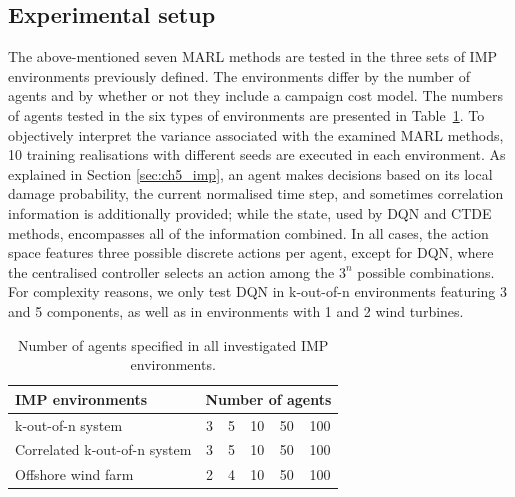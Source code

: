 \subsection{Experimental setup}

The above-mentioned seven MARL methods are tested in the three sets of IMP environments previously defined.
The environments differ by the number of agents and by whether or not they include a campaign cost model.
The numbers of agents tested in the six types of environments are presented in Table~\ref{tab:experiments_details}.
To objectively interpret the variance associated with the examined MARL methods, 10 training realisations with different seeds are executed in each environment.
As explained in Section \ref{sec:ch5_imp}, an agent makes decisions based on its local damage probability, the current normalised time step, and sometimes correlation information is additionally provided; while the state, used by DQN and CTDE methods, encompasses all of the information combined.
In all cases, the action space features three possible discrete actions per agent, except for DQN, where the centralised controller selects an action among the $3^n$ possible combinations.
For complexity reasons, we only test DQN in k-out-of-n environments featuring 3 and 5 components, as well as in environments with 1 and 2 wind turbines.

\begin{table}[t]
  \caption{Number of agents specified in all investigated IMP environments.}
    \label{tab:experiments_details}
  \centering
    \begin{tabular}{lccccc}
    \toprule
    IMP environments & \multicolumn{5}{l}{Number of agents}  \\
     \midrule
    k-out-of-n system & 3 & 5 & 10 & 50 & 100 \\
     Correlated k-out-of-n system & 3 & 5 & 10 & 50 & 100 \\
     Offshore wind farm & 2 & 4 & 10 & 50 & 100  \\
    \bottomrule
    \end{tabular}
\end{table}

